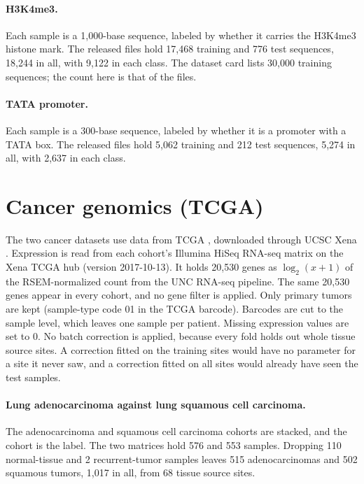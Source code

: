 \paragraph{H3K4me3.} Each sample is a 1,000-base sequence, labeled by whether it carries the H3K4me3 histone mark. The released files hold 17,468 training and 776 test sequences, 18,244 in all, with 9,122 in each class. The dataset card lists 30,000 training sequences; the count here is that of the files.

\paragraph{TATA promoter.} Each sample is a 300-base sequence, labeled by whether it is a promoter with a TATA box. The released files hold 5,062 training and 212 test sequences, 5,274 in all, with 2,637 in each class.

\section{Cancer genomics (TCGA)}\label{app:datasets:tcga}

The two cancer datasets use data from TCGA \citep{Weinstein2013}, downloaded through UCSC Xena \citep{Goldman2020}. Expression is read from each cohort's Illumina HiSeq RNA-seq matrix on the Xena TCGA hub (version 2017-10-13). It holds 20,530 genes as $\log_2(x+1)$ of the RSEM-normalized count \citep{Li2011RSEM} from the UNC RNA-seq pipeline. The same 20,530 genes appear in every cohort, and no gene filter is applied. Only primary tumors are kept (sample-type code 01 in the TCGA barcode). Barcodes are cut to the sample level, which leaves one sample per patient. Missing expression values are set to 0. No batch correction is applied, because every fold holds out whole tissue source sites. A correction fitted on the training sites would have no parameter for a site it never saw, and a correction fitted on all sites would already have seen the test samples.

\paragraph{Lung adenocarcinoma against lung squamous cell carcinoma.} The adenocarcinoma \citep{TCGA2014LUAD} and squamous cell carcinoma \citep{TCGA2012LUSC} cohorts are stacked, and the cohort is the label. The two matrices hold 576 and 553 samples. Dropping 110 normal-tissue and 2 recurrent-tumor samples leaves 515 adenocarcinomas and 502 squamous tumors, 1,017 in all, from 68 tissue source sites.

